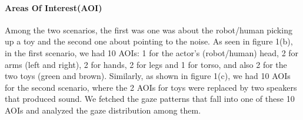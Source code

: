 \documentclass[a4,twocolumn,10pt]{article}
\begin{document}
\paragraph{Areas Of Interest(AOI)}

Among the two scenarios, the first was one was about the robot/human picking up
a toy and the second one about pointing to the noise. As seen in figure 1(b), in
the first scenario, we had 10 AOIs: 1 for the actor's (robot/human) head, 2 for
arms (left and right), 2 for hands, 2 for legs and 1 for torso, and also 2 for
the two toys (green and brown). Similarly, as shown in figure 1(c), we had 10
AOIs for the second scenario, where the 2 AOIs for toys were replaced by two
speakers that produced sound. We fetched the gaze patterns that fall into one of
these 10 AOIs and analyzed the gaze distribution among them.
\end{document}
